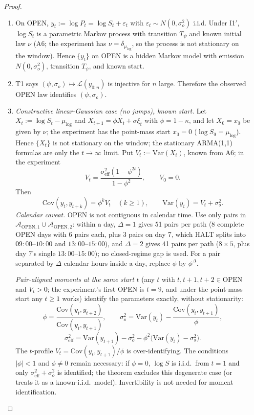 \begin{proof}
\begin{enumerate}
\item On OPEN, $y_t:=\log P_t=\log S_t+\varepsilon_t$ with
$\varepsilon_t\sim N(0,\sigma_o^2)$ i.i.d.  Under I1$'$, $\log S_t$ is a
parametric Markov process with transition $T_\psi$ and known initial law $\nu$
(A6; the experiment has $\nu=\delta_{\mu_{\log}}$, so the process is not
stationary on the window).  Hence $\{y_t\}$ on OPEN is a hidden Markov model
with emission $N(0,\sigma_o^2)$, transition $T_\psi$, and known start.
\item T1 says $(\psi,\sigma_o)\mapsto\mathcal L(y_{0:n})$ is injective for $n$
large.  Therefore the observed OPEN law identifies $(\psi,\sigma_o)$.
\item \emph{Constructive linear-Gaussian case (no jumps), known start.}  Let
$X_t:=\log S_t-\mu_{\log}$ and
$X_{t+1}=\phi X_t+\sigma\xi_t$ with $\phi=1-\kappa$, and let $X_0=x_0$ be given
by $\nu$; the experiment has the point-mass start $x_0=0$
($\log S_0=\mu_{\log}$).  Hence $\{X_t\}$ is not stationary on the window; the
stationary ARMA(1,1) formulas are only the $t\to\infty$ limit.  Put
$V_t:=\mathrm{Var}(X_t)$, known from A6; in the experiment
\[
V_t=\frac{\sigma_{\mathrm{eff}}^2(1-\phi^{2t})}{1-\phi^2},
\qquad V_0=0.
\]
Then
\[
\mathrm{Cov}(y_t,y_{t+k})=\phi^k V_t\quad(k\ge1),
\qquad
\mathrm{Var}(y_t)=V_t+\sigma_o^2.
\]
\emph{Calendar caveat.}  OPEN is not contiguous in calendar time.  Use only
pairs in $\mathcal A_{\mathrm{OPEN},1}\cup\mathcal A_{\mathrm{OPEN},2}$: within a
day, $\Delta=1$ gives 51 pairs per path (8 complete OPEN days with 6 pairs each,
plus 3 pairs on day 7, which HALT splits into $09{:}00$--$10{:}00$ and
$13{:}00$--$15{:}00$), and $\Delta=2$ gives 41 pairs per path ($8\times5$, plus
day 7's single $13{:}00$--$15{:}00$); no closed-regime gap is used.  For a pair
separated by $\Delta$ calendar hours inside a day, replace $\phi$ by
$\phi^\Delta$.

\emph{Pair-aligned moments at the same start $t$} (any $t$ with
$t,t+1,t+2\in\mathrm{OPEN}$ and $V_t>0$; the experiment's first OPEN is $t=9$,
and under the point-mass start any $t\ge1$ works) identify the parameters
exactly, without stationarity:
\[
\phi=\frac{\mathrm{Cov}(y_t,y_{t+2})}{\mathrm{Cov}(y_t,y_{t+1})},
\qquad
\sigma_o^2=\mathrm{Var}(y_t)-\frac{\mathrm{Cov}(y_t,y_{t+1})}{\phi},
\]
\[
\sigma_{\mathrm{eff}}^2
=\mathrm{Var}(y_{t+1})-\sigma_o^2
-\phi^2\bigl(\mathrm{Var}(y_t)-\sigma_o^2\bigr).
\]
The $t$-profile $V_t=\mathrm{Cov}(y_t,y_{t+1})/\phi$ is over-identifying.  The
conditions $|\phi|<1$ and $\phi\ne0$ remain necessary: if $\phi=0$, $\log S$ is
i.i.d.\ from $t=1$ and only $\sigma_{\mathrm{eff}}^2+\sigma_o^2$ is identified;
the theorem excludes this degenerate case (or treats it as a known-i.i.d.\
model).  Invertibility is not needed for moment identification.


\end{enumerate}
\end{proof}
